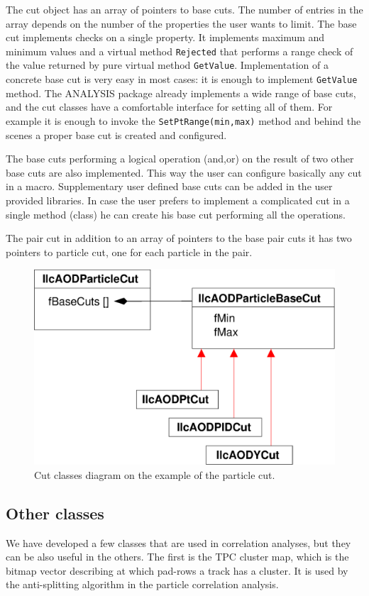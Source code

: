 \documentclass[12pt,a4paper,twoside]{article}
\begin{document}
{The cut object has an array of pointers to
base cuts. The number of entries in the array depends 
on the number of the properties the user wants to limit. 
The base cut implements checks on a single property. 
It implements maximum and minimum values and a virtual method \texttt{Rejected} 
that performs a range check of the value returned by pure
virtual method \texttt{GetValue}. Implementation of a concrete
base cut is very easy in most cases: it is enough to
implement \texttt{GetValue} method. The ANALYSIS package
already implements a wide range of base cuts,
and the cut classes have a comfortable interface for
setting all of them. For example it is enough to invoke
the \texttt{SetPtRange(min,max)} method and behind the scenes
a proper base cut is created and configured.

The base cuts performing a logical operation (and,or) on the result of two
other base cuts are also implemented. This way the user can configure basically any
cut in a macro. Supplementary user defined base cuts can be added in the user 
provided libraries.
In case the user prefers to implement a complicated cut in a single method (class) 
he can create his base cut performing all the operations.

The pair cut in addition to an array of pointers to the base pair 
cuts it has two pointers to particle cut, one for each particle in
the pair. 

\begin{figure}
  \begin{center}
    \includegraphics[width=0.4\columnwidth, origin=c]{picts/partcuts}
  \end{center}
  \caption
  {Cut classes diagram on the example of the particle cut.
    \label{cap:soft:partcut}}
\end{figure}


\subsection{Other classes}

We have developed a few classes that are used in correlation analyses,
but they can be also useful in the others. The first is the TPC cluster map,
which is the bitmap vector describing at which pad-rows a track has a cluster.
It is used by the anti-splitting algorithm in the particle correlation
analysis.

}
\end{document}
